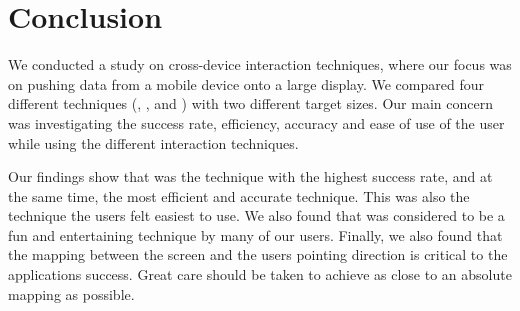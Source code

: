 \section{Conclusion}

We conducted a study on cross-device interaction techniques, where our focus was on pushing data from a mobile device onto a large display.
We compared four different techniques (\pinch, \swipe, \throw and \tilt) with two different target sizes.
Our main concern was investigating the success rate, efficiency, accuracy and ease of use of the user while using the different interaction techniques.

Our findings show that \swipe was the technique with the highest success rate, and at the same time, the most efficient and accurate technique.
This was also the technique the users felt easiest to use.
We also found that \pinch was considered to be a fun and entertaining technique by many of our users.
Finally, we also found that the mapping between the screen and the users pointing direction is critical to the applications success. 
Great care should be taken to achieve as close to an absolute mapping as possible. 